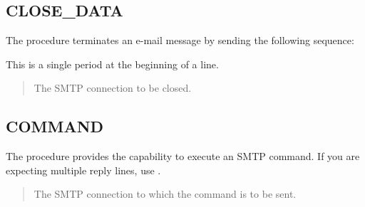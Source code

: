 \documentclass[letterpaper,10pt,english,openany,oneside]{sphinxmanual}
\begin{document}
\subsection{CLOSE\_DATA}
\label{\detokenize{utl_smtp:close-data}}
The  procedure terminates an e-mail message by sending the
following sequence:
\begin{quote}

\end{quote}

This is a single period at the beginning of a line.



\begin{quote}

The SMTP connection to be closed.
\end{quote}


\subsection{COMMAND}
\label{\detokenize{utl_smtp:command}}
The  procedure provides the capability to execute an SMTP
command. If you are expecting multiple reply lines, use
.
\begin{quote}

\begin{DUlineblock}{0em}
\item[] 
\item[] 
\item[] 
\end{DUlineblock}
\end{quote}


\begin{quote}

The SMTP connection to which the command is to be sent.
\end{quote}
\end{document}
